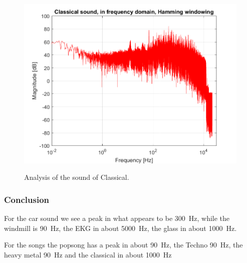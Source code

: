 \begin{figure}[htb!]
	{\includegraphics[width=0.45\linewidth]{code/Classical_figure5.png}}
	\caption{Analysis of the sound of Classical.}\label{fig:klassisk}
\end{figure}

\subsubsection{Conclusion}

For the car sound we see a peak in what appears to be \SI{300}{\hertz}, while the windmill is \SI{90}{\hertz}, the EKG in about \SI{5000}{\hertz}, the glass in about \SI{1000}{\hertz}. 

For the songs the popsong has a peak in about \SI{90}{\hertz}, the Techno \SI{90}{\hertz}, the heavy metal \SI{90}{\hertz} and the classical in about \SI{1000}{\hertz}
